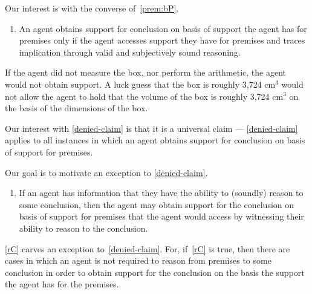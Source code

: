 \begin{note}[Focus]
Our interest is with the converse of~\ref{prem:bP}.

\begin{enumerate}[label=\mp{}, ref=\mp{}]
\item\label{denied-claim} An agent obtains support for conclusion on basis of support the agent has for premises only if the agent accesses support they have for premises and traces implication through valid and subjectively sound reasoning.
\end{enumerate}
If the agent did not measure the box, nor perform the arithmetic, the agent would not obtain support.
A luck guess that the box is roughly 3,724 cm\(^{3}\) would not allow the agent to hold that the volume of the box is roughly 3,724 cm\(^{3}\) on the basis of the dimensions of the box.
\end{note}

\begin{note}[Alternative]
  Our interest with \ref{denied-claim} is that it is a universal claim --- \ref{denied-claim} applies to all instances in which an agent obtains support for conclusion on basis of support for premises.

  Our goal is to motivate an exception to \ref{denied-claim}.

  \begin{enumerate}[label=\rC{}, ref=\rC{}]
  \item\label{rC} If an agent has information that they have the ability to (soundly) reason to some conclusion, then the agent may obtain support for the conclusion on basis of support for premises that the agent would access by witnessing their ability to reason to the conclusion.
  \end{enumerate}

  \ref{rC} carves an exception to~\ref{denied-claim}.
  For, if~\ref{rC} is true, then there are cases in which an agent is not required to reason from premises to some conclusion in order to obtain support for the conclusion on the basis the support the agent has for the premises.
\end{note}

